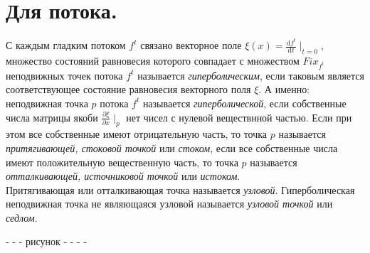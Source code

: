 \newpage

\section{Для потока.} 

С каждым гладким потоком \(f^t\) связано векторное поле \(\xi (x) = \frac{\mathrm{d}f^t}{\mathrm{d}t} \mid_{t = 0}\), множество состояний равновесия 
которого совпадает с множеством \(Fix_{f^t}\) неподвижных точек потока \(f^t\) называется \textit{гиперболическим}, если таковым является соответствующее
состояние равновесия векторного поля \(\xi\). А именно: неподвижная точка \(p\) потока \(f^t\) называется \textit{гиперболической}, 
если собственные числа матрицы якоби \(\frac{\partial \xi }{\partial x} \mid_p\) нет чисел с нулевой веществнной частью.
Если при этом все собственные имеют отрицательную часть, то точка \(p\) называется \textit{притягивающей, стоковой точкой} или \textit{стоком},
если все собственные числа имеют положительную вещественную часть, то точка \(p\) называется \textit{отталкивающей, источниковой точкой} или \textit{истоком}. 
\\[2mm]
Притягивающая или отталкивающая точка называется \textit{узловой}. Гиперболическая неподвижная точка
не являющаяся узловой называется \textit{узловой точкой} или \textit{седлом}.

- - - рисунок - - - -\\

